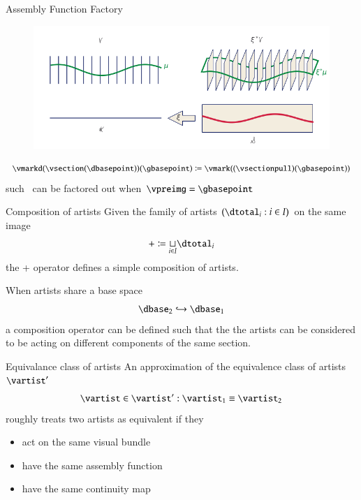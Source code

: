 \documentclass[xcolor={dvipsnames}, handout]{beamer}
\begin{document}
\begin{frame}{Assembly Function Factory}
\begin{figure}[H]
    \includegraphics[width=1\textwidth]{figures/math/q_hat.png}
\end{figure}
\begin{equation}
\label{eq:qhat_q_s}
\vmarkd(\vsection(\dbasepoint))(\gbasepoint) \coloneqq \vmark((\vsectionpull)(\gbasepoint))
\end{equation} 
such \gbasepoint\ can be factored out when $\vpreimg = \gbasepoint$
\end{frame}

\begin{frame}{Composition of artists}
    Given the family of artists $(\dtotal_i: i\in I)$ on the same image
    \begin{equation}
        + \coloneqq \underset{i\in I}{\sqcup} \dtotal_{i}
    \end{equation}
    the + operator defines a simple composition of artists. 

    When artists share a base space 
    \begin{equation}
        \dbase_2 \hookrightarrow \dbase_1
    \end{equation}
    a composition operator can be defined such that the the artists can be considered to be acting on different components of the same section. 
\end{frame}
\begin{frame}{Equivalance class of artists}
    An approximation of the equivalence class of artists $\vartist^{\prime}$
    \begin{equation}
    \vartist \in \vartist^{\prime}: \vartist_{1} \equiv \vartist_{2}
    \end{equation}
    roughly treats two artists as equivalent if they 
    \begin{itemize}
        \item act on the same visual bundle \vtotal
        \item have the same assembly function \vmark 
        \item have the same continuity map \vindex 
    \end{itemize}
\end{frame}
\end{document}
